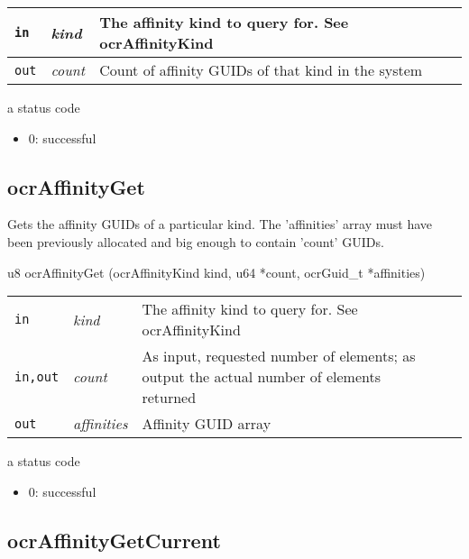 \begin{table}[h]
\begin{tabular}{l l l}
\hline
\mbox{\tt in}  & {\em kind} & The affinity kind to query for. See {ocr\-Affinity\-Kind} \\
\hline
\mbox{\tt out}  & {\em count} & Count of affinity G\-U\-I\-Ds of that kind in the system \\
\hline
\end{tabular}
\end{table}

\returns
a status code
\begin{itemize}
\item 0\-: successful 
\end{itemize}
 


\subsection{ocr\-Affinity\-Get}
\summary
Gets the affinity G\-U\-I\-Ds of a particular kind. The 'affinities' array must have been previously allocated and big enough to contain 'count' G\-U\-I\-Ds. 

\begin{boxedcode}
 u8 ocrAffinityGet (ocrAffinityKind kind,  u64 *count, 
                              ocrGuid\_t *affinities)
\end{boxedcode}


\begin{table}[h]
\begin{tabular}{p{0.7in} p{0.75in} p{3.5in} l l}
\hline
\mbox{\tt in}         & {\em kind}        & The affinity kind to query for. See ocr\-Affinity\-Kind \\
 
\mbox{\tt in,out}  & {\em count}     &  As input, requested number of elements; as output the actual number of elements returned \\
 
\mbox{\tt out}     & {\em affinities} & Affinity G\-U\-I\-D array \\
\hline
\end{tabular}
\end{table}

\returns
a status code
\begin{itemize}
\item 0\-: successful 
\end{itemize}

\subsection{ocr\-Affinity\-Get\-Current}
 
